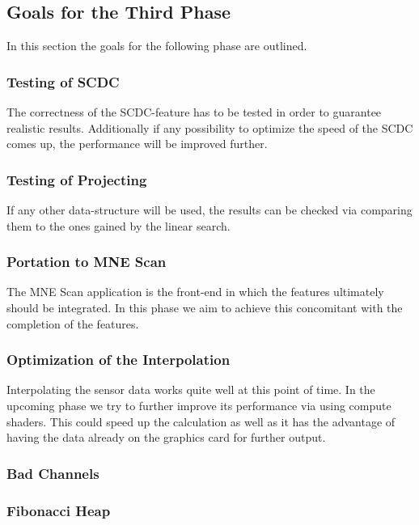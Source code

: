 \subsection{Goals for the Third Phase}
In this section the goals for the following phase are outlined. 

\subsubsection{Testing of SCDC}
The correctness of the SCDC-feature has to be tested in order to guarantee realistic results. Additionally if any possibility to optimize the speed of the SCDC comes up, the performance will be improved further.
\subsubsection{Testing of Projecting}
If any other data-structure will be used, the results can be checked via comparing them to the ones gained by the linear search.
\subsubsection{Portation to MNE Scan}
The MNE Scan application is the front-end in which the features ultimately should be integrated. In this phase we aim to achieve this concomitant with the completion of the features.
\subsubsection{Optimization of the Interpolation}
Interpolating the sensor data works quite well at this point of time. In the upcoming phase we try to further improve its performance via using compute shaders. This could speed up the calculation as well as it has the advantage of having the data already on the graphics card for further output.
\subsubsection{Bad Channels}
\subsubsection{Fibonacci Heap}